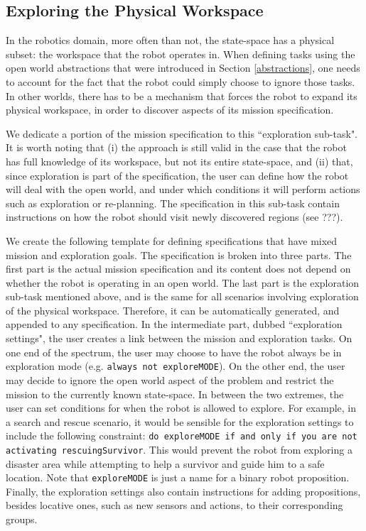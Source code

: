 \subsection{Exploring the Physical Workspace}

In the robotics domain, more often than not, the state-space has a physical subset: the workspace that the robot operates in. When defining tasks using the open world abstractions that were introduced in Section \ref{abstractions}, one needs to account for the fact that the robot could simply choose to ignore those tasks. In other worlds, there has to be a mechanism that forces the robot to expand its physical workspace, in order to discover aspects of its mission specification.

We dedicate a portion of the mission specification to this ``exploration sub-task". It is worth noting that (i) the approach is still valid in the case that the robot has full knowledge of its workspace, but not its entire state-space, and (ii) that, since exploration is part of the specification, the user can define how the robot will deal with the open world, and under which conditions it will perform actions such as exploration or re-planning. The specification in this sub-task contain instructions on how the robot should visit newly discovered regions (see ???).

We create the following template for defining specifications that have mixed mission and exploration goals. The specification is broken into three parts. The first part is the actual mission specification and its content does not depend on whether the robot is operating in an open world. The last part is the exploration sub-task mentioned above, and is the same for all scenarios involving exploration of the physical workspace. Therefore, it can be automatically generated, and appended to any specification. In the intermediate part, dubbed ``exploration settings", the user creates a link between the mission and exploration tasks. On one end of the spectrum, the user may choose to have the robot always be in exploration mode (e.g. \texttt{always not exploreMODE}). On the other end, the user may decide to ignore the open world aspect of the problem and restrict the mission to the currently known state-space. In between the two extremes, the user can set conditions for when the robot is allowed to explore. For example, in a search and rescue scenario, it would be sensible for the exploration settings to include the following constraint: \texttt{do exploreMODE if and only if you are not activating rescuingSurvivor}. This would prevent the robot from exploring a disaster area while attempting to help a survivor and guide him to a safe location. Note that \texttt{exploreMODE} is just a name for a binary robot proposition. Finally, the exploration settings also contain instructions for adding propositions, besides locative ones, such as new sensors and actions, to their corresponding groups.

